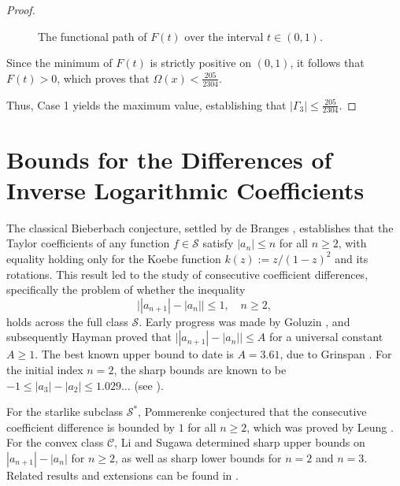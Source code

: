\documentclass[10pt,a4paper]{amsart}
\numberwithin{equation}{section}
\begin{document}
\begin{proof}
\begin{figure}[htbp]
\centering
{}
\caption{The functional path of $F(t)$ over the interval $t \in (0,1)$.}
\label{fig:polynomial_landscape}
\end{figure}

Since the minimum of $F(t)$ is strictly positive on $(0,1)$, it follows that $F(t) > 0$, which proves that $\Omega(x) < \frac{205}{2304}$.

Thus, Case 1 yields the maximum value, establishing that $|\Gamma_3| \le \frac{205}{2304}$.
\end{proof}

\section{Bounds for the Differences of Inverse Logarithmic Coefficients}
The classical Bieberbach conjecture, settled by de Branges \cite{LDB1}, establishes that the Taylor coefficients of any function $f \in \mathcal{S}$ satisfy $|a_n| \leq n$ for all $n \geq 2$, with equality holding only for the Koebe function $k(z) := z/(1-z)^2$ and its rotations. This result led to the study of consecutive coefficient differences, specifically the problem of whether the inequality
\[
\bigl||a_{n+1}| - |a_n|\bigr| \leq 1, \quad n \geq 2,
\]
holds across the full class $\mathcal{S}$. Early progress was made by Goluzin \cite{G1}, and subsequently Hayman \cite{H} proved that $\bigl||a_{n+1}| - |a_n|\bigr| \leq A$ for a universal constant $A \geq 1$. The best known upper bound to date is $A = 3.61$, due to Grinspan \cite{G2}. For the initial index $n=2$, the sharp bounds are known to be $-1 \leq |a_3| - |a_2| \leq 1.029\ldots$ (see \cite[Theorem 3.11]{PLD1}).

For the starlike subclass $\mathcal{S}^\ast$, Pommerenke \cite{Pommerenke1971} conjectured that the consecutive coefficient difference is bounded by $1$ for all $n \geq 2$, which was proved by Leung \cite{Leung1978}. For the convex class $\mathcal{C}$, Li and Sugawa \cite{LiSugawa} determined sharp upper bounds on $|a_{n+1}| - |a_n| $ for $n \geq 2$, as well as sharp lower bounds for $n=2$ and $n=3$. Related results and extensions can be found in \cite{Peng2019, Arora2019, Arora2023}.
\end{document}
